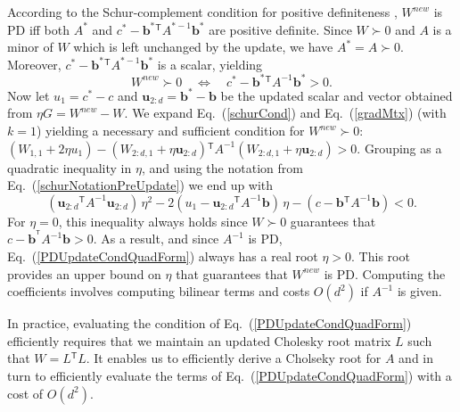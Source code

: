 \documentclass[twoside,11pt]{article}
\newcommand\mat[1]{{#1}}
\renewcommand\vec[1]{\mathbf{#1}}
\newcommand{\T}{{}^\mathsf{T}}
\newcommand{\W}{\mat{W}}
\newcommand{\newW}{{\mat{W^{new}}}}
\newcommand{\cholL}{\mat{L}}
\newcommand{\A}{\mat{A}}
\newcommand{\B}{\vec{b}}
\newcommand{\C}{c}
\newcommand{\invA}{A^{-1}}
\newcommand{\uscalar}{{u}_{1}}
\newcommand{\uvec}{\vec{u}_{2:d}}
\newcommand{\Wvec}{\W_{2:d,1}}
\newcommand{\Wscalar}{\W_{1,1}}
\renewcommand{\eqref}[1]{Eq.~(\ref{#1})}
\begin{document}
According to the Schur-complement condition for positive definiteness
\citep[p. 650]{boyd2004convex}, $\newW$ is PD iff both
$A^*$ and $\C^* - \B^*\T A^{*-1} \B^*$ are positive definite.
Since $W \succ 0$ and $A$ is a minor of $\W$ which is left unchanged by the update, we have $A^* =
A \succ 0$. Moreover, $\C^* - \B^*\T A^{*-1} \B^*$ is a
scalar, yielding
\begin{equation}
  \newW \succ  0 \quad \Leftrightarrow \quad  \C^* - \B^*\T \invA \B^* >  0.
  \label{schurCond}
\end{equation}
Now let $\uscalar = \C^* - \C$ and $\uvec = \B^* - \B$ be the updated scalar and vector
obtained from $\eta G = \newW - \W$. We expand \eqref{schurCond} and
\eqref{gradMtx} (with $k=1$) yielding a necessary and sufficient condition for $\newW \succ 0$: $(\Wscalar + 2\eta \uscalar)-(\Wvec + \eta \uvec)\T \invA (\Wvec + \eta \uvec)   > 0$.
Grouping as a quadratic inequality in $\eta$, and using the notation from \eqref{schurNotationPreUpdate} we end up with
\begin{equation}
\label{PDUpdateCondQuadForm}
(\uvec\T \invA \uvec) \, \eta^2 
-2(\uscalar - \uvec\T \invA \B) \,\eta 
-(\C - \B\T  \invA \B) < 0 .
\end{equation}
For $\eta = 0$, this inequality always holds since $\W \succ 0$ guarantees that $\C-\B^{\T} \invA \B >0$. As a result, and since $\invA$ is PD, \eqref{PDUpdateCondQuadForm} always has a real
root $\eta > 0$. This root provides an upper bound on $\eta$ that guarantees that $\newW$ is PD. Computing the coefficients involves computing bilinear terms and costs $O(d^2)$ if $\invA$ is given.

In practice, evaluating the condition of \eqref{PDUpdateCondQuadForm} efficiently requires that we maintain an updated Cholesky root matrix $\cholL$ such that $\W = \cholL\T \cholL$. It enables us to efficiently derive a Cholseky root for $\A$ \citep{Davis05rowchol} and in turn to efficiently evaluate the terms of \eqref{PDUpdateCondQuadForm} with a cost of $O(d^2)$. 
\end{document}
